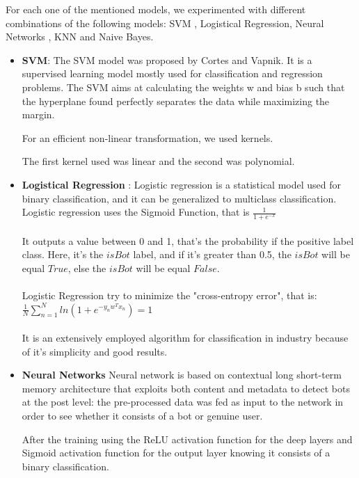\documentclass{article}
\begin{document}
For each one of the mentioned models, we experimented with different combinations of the following models: SVM , Logistical Regression, Neural Networks , KNN and Naive Bayes. 
        \begin{itemize}
        \item \textbf{SVM}:  The SVM model was proposed by Cortes and Vapnik. It is a supervised learning model mostly used for classification and regression problems. The SVM aims at calculating the weights w and bias b such that the hyperplane found perfectly separates the data while maximizing the margin.
    
    For an efficient non-linear transformation, we used kernels.
    
    The first kernel used was linear and the second was polynomial.
        \item \textbf{Logistical Regression} :     Logistic regression is a statistical model used for binary classification, and it can be generalized to multiclass classification. \\
Logistic regression uses the Sigmoid Function, that is $\frac{1}{1+e^{-x}}$\\ \\ It outputs a value between 0 and 1, that's the probability if the positive label class. Here, it's the $isBot$ label, and if it's greater than 0.5, the $isBot$ will be equal $True$, else the $isBot$ will be equal $False$.  \\ \\
Logistic Regression try to minimize the "cross-entropy error", that is:\\ $\frac{1}{N} \sum_{n=1}^{N} ln(1 + e^ {-y_{n}w^Tx_n}) = 1$\\ \\
It is an extensively employed algorithm for classification in industry because of it's simplicity and good results. \\

        \item \textbf{Neural Networks}     Neural network is based on contextual long short-term memory architecture that exploits both content and metadata to detect bots at the post level: the pre-processed data was fed as  input to the network in order to see whether it consists of a bot or genuine user. 
    
    After the training using the ReLU activation function for the deep layers and Sigmoid activation function for the output layer knowing it consists of a binary classification.
    

\end{itemize}
\end{document}
